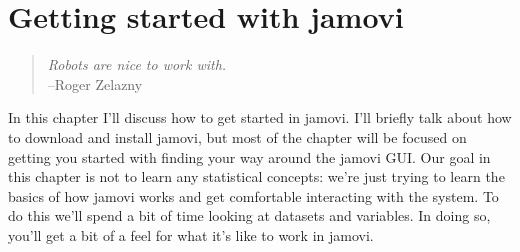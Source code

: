 

\chapter{Getting started with jamovi\label{ch:introj}}

\begin{quote}
{\it Robots are nice to work with.}\\ 
\hspace*{2cm}--Roger Zelazny
\end{quote}


\noindent
In this chapter I'll discuss how to get started in jamovi. I'll briefly talk about how to download and install jamovi, but most of the chapter will be focused on getting you started with finding your way around the jamovi GUI. Our goal in this chapter is not to learn any statistical concepts: we're just trying to learn the basics of how jamovi works and get comfortable interacting with the system. To do this we'll spend a bit of time looking at datasets and variables. In doing so, you'll get a bit of a feel for what it's like to work in jamovi. 

